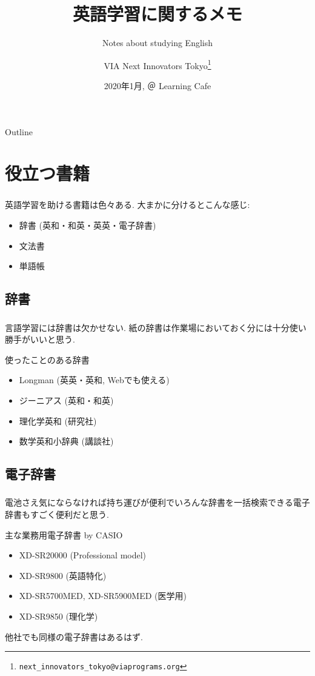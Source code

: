 \documentclass[dvipdfmx,10pt]{beamer}
\title{英語学習に関するメモ}
\subtitle{Notes about studying English}
\author[VIA Next Innovators Tokyo]{VIA Next Innovators Tokyo\footnote{\texttt{next\_innovators\_tokyo@viaprograms.org}}}
\date[2020年1月]{2020年1月, ＠ Learning Cafe}
\begin{document}
\begin{frame}
\titlepage
\end{frame}
\begin{frame}{Outline}
  \setcounter{tocdepth}{3}  
  \tableofcontents[
    sectionstyle=show,
    subsectionstyle=show/show,
    subsubsectionstyle=show/show/show
    ]
\end{frame}
\section{役立つ書籍}
\begin{frame}\frametitle{\insertsection}
英語学習を助ける書籍は色々ある. 大まかに分けるとこんな感じ:
\begin{itemize}
\item 辞書 (英和・和英・英英・電子辞書)
\item 文法書
\item 単語帳
\end{itemize}
\end{frame}
\subsection{辞書}
\begin{frame}\frametitle{\insertsubsection}
言語学習には辞書は欠かせない. 紙の辞書は作業場においておく分には十分使い勝手がいいと思う.
\begin{exampleblock}{使ったことのある辞書}
\begin{itemize}
\item Longman (英英・英和, Webでも使える)
\item ジーニアス (英和・和英)
\item 理化学英和 (研究社)
\item 数学英和小辞典 (講談社)
\end{itemize}
\end{exampleblock}
\end{frame}
\subsection{電子辞書}
\begin{frame}\frametitle{\insertsubsection}
電池さえ気にならなければ持ち運びが便利でいろんな辞書を一括検索できる電子辞書もすごく便利だと思う.
\begin{exampleblock}{主な業務用電子辞書 by CASIO}
\begin{itemize}
\item XD-SR20000 (Professional model)
\item XD-SR9800 (英語特化)
\item XD-SR5700MED, XD-SR5900MED (医学用)
\item XD-SR9850 (理化学)
\end{itemize}
\end{exampleblock}
他社でも同様の電子辞書はあるはず.
\end{frame}
\end{document}
